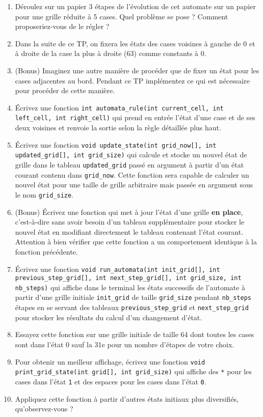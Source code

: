 \documentclass[11pt]{article}
\begin{document}
\begin{enumerate}
\item Déroulez sur un papier 3 étapes de l'évolution de cet automate sur un papier pour une grille réduite à 5 cases. Quel problème se pose ? Comment proposeriez-vous de le régler ?
\item Dans la suite de ce TP, on fixera les états des cases voisines à gauche de 0 et à droite de la case la plus à droite (63) comme constants à 0.
\item (Bonus) Imaginez une autre manière de procéder que de fixer un état pour les cases adjacentes au bord. Pendant ce TP implémentez ce qui est nécessaire pour procéder de cette manière.
\item Écrivez une fonction \texttt{int automata\_rule(int current\_cell, int left\_cell, int right\_cell)} qui prend en entrée l'état d'une case et de ses deux voisines et renvoie la sortie selon la règle détaillée plus haut.
\item Écrivez une fonction \texttt{void update\_state(int grid\_now[], int updated\_grid[], int grid\_size)} qui calcule et stocke un nouvel état de grille dans le tableau \texttt{updated\_grid} passé en argument à partir d'un état courant contenu dans \texttt{grid\_now}. Cette fonction sera capable de calculer un nouvel état pour une taille de grille arbitraire mais passée en argument sous le nom \texttt{grid\_size}.
\item (Bonus) Écrivez une fonction qui met à jour l'état d'une grille \textbf{en place}, c'est-à-dire sans avoir besoin d'un tableau supplémentaire pour stocker le nouvel état en modifiant directement le tableau contenant l'état courant. Attention à bien vérifier que cette fonction a un comportement identique à la fonction précédente.
\item Écrivez une fonction \texttt{void run\_automata(int init\_grid[], int previous\_step\_grid[], int next\_step\_grid[], int grid\_size, int nb\_steps)} qui affiche dans le terminal les états successifs de l'automate à partir d'une grille initiale \texttt{init\_grid} de taille \texttt{grid\_size} pendant \texttt{nb\_steps} étapes en se servant des tableaux \texttt{previous\_step\_grid} et \texttt{next\_step\_grid} pour stocker les résultats du calcul d'un changement d'état.
\item Essayez cette fonction sur une grille initiale de taille 64 dont toutes les cases sont dans l'état 0 sauf la 31e pour un nombre d'étapes de votre choix.
\item Pour obtenir un meilleur affichage, écrivez une fonction \texttt{void print\_grid\_state(int grid[], int grid\_size)} qui affiche des \texttt{*} pour les cases dans l'état \texttt{1} et des espaces pour les cases dans l'état \texttt{0}.
\item Appliquez cette fonction à partir d'autres états initiaux plus diversifiés, qu'observez-vous ?
\end{enumerate}
\end{document}
